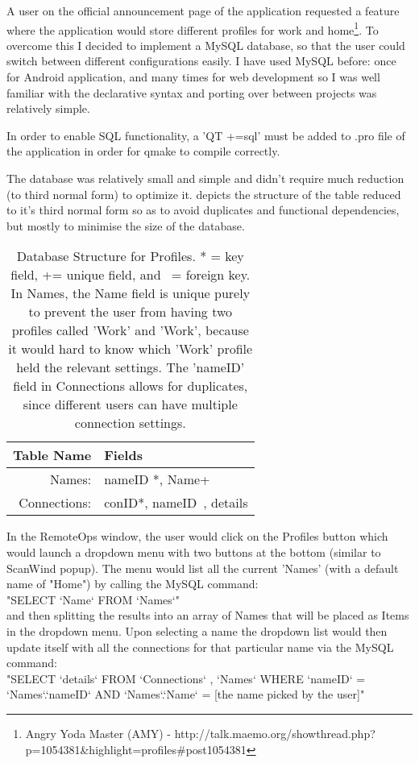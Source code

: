 \documentclass[11pt]{article} %
\newcommand{\tab}{\hspace*{2em}}
\begin{document}
A user on the official announcement page of the application requested a feature where the application would store different profiles for work and home\footnote{Angry Yoda Master (AMY) - http://talk.maemo.org/showthread.php?p=1054381\&highlight=profiles\#post1054381}.
To overcome this I decided to implement a MySQL database, so that the user could switch between different configurations easily. I have used MySQL before: once for Android application, and many times for web development so I was well familiar with the declarative syntax and porting over between projects was relatively simple.

In order to enable SQL functionality, a 'QT +=sql' must be added to .pro file of the application in order for qmake to compile correctly.

The database was relatively small and simple and didn't require much reduction (to third normal form) to optimize it.  depicts the structure of the table reduced to it's third normal form so as to avoid duplicates and functional dependencies, but mostly to minimise the size of the database.
\begin{table}[H]
\centering
\begin{tabular}{| r | l | }
\hline
Table Name	&Fields\\\hline
Names:		&nameID *, Name+\\
Connections: 	&conID*, nameID~, details\\\hline
\end{tabular}
\caption{Database Structure for Profiles. * = key field, += unique field, and ~= foreign key. In Names, the Name field is unique purely to prevent the user from having two profiles called 'Work' and 'Work', because it would hard to know which 'Work' profile held the relevant settings. The 'nameID' field in Connections allows for duplicates, since different users can have multiple connection settings.}
\label{tab:profiledb}
\end{table}

In the RemoteOps window, the user would click on the Profiles button which would launch a dropdown menu with two buttons at the bottom (similar to ScanWind popup). The menu would list all the current 'Names' (with a default name of "Home") by calling the MySQL command:\\
\tab"SELECT `Name` FROM `Names`"\\
and then splitting the results into an array of Names that will be placed as Items in the dropdown menu. Upon selecting a name the dropdown list would then update itself with all the connections for that particular name via the MySQL command:\\
\tab"SELECT `details` FROM `Connections` , `Names` WHERE `nameID` = `Names`.`nameID` AND `Names`.`Name` =  [the name picked by the user]"
\end{document}
